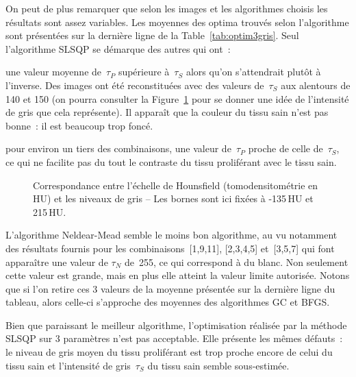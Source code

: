 \documentclass[main.tex]{subfiles}
\begin{document}
On peut de plus remarquer que selon les images et les algorithmes choisis les résultats sont assez variables. Les moyennes des optima trouvés selon l'algorithme sont présentées sur la dernière ligne de la Table~\ref{tab:optim3gris}. Seul l'algorithme SLSQP se démarque des autres qui ont~:
\begin{myitemize}
\item une valeur moyenne de~$\tau_P$ supérieure à~$\tau_S$ alors qu'on s'attendrait plutôt à l'inverse. 
Des images ont été reconstituées avec des valeurs de~$\tau_S$ aux alentours de 140 et 150 (on pourra consulter la Figure~\ref{fig:schema_correspondance_gris} pour se donner une idée de l'intensité de gris que cela représente). Il apparaît que la couleur du tissu sain n'est pas bonne~: il est beaucoup trop foncé. 
\item pour environ un tiers des combinaisons, une valeur de~$\tau_P$ proche de celle de~$\tau_S$, ce qui ne facilite pas du tout le contraste du tissu proliférant avec le tissu sain.
\end{myitemize}

\begin{figure}[h]
\centering

\caption{\label{fig:schema_correspondance_gris} Correspondance entre l'échelle de Hounsfield (tomodensitométrie en HU) et les niveaux de gris -- Les bornes sont ici fixées à -135\,HU et 215\,HU.}
\end{figure}

L'algorithme Neldear-Mead semble le moins bon algorithme, au vu notamment des résultats fournis pour les combinaisons~[1,9,11], [2,3,4,5] et~[3,5,7] qui font apparaître une valeur de $\tau_N$ de~255, ce qui correspond à du blanc. Non seulement cette valeur est grande, mais en plus elle atteint la valeur limite autorisée. Notons que si l'on retire ces 3 valeurs de la moyenne présentée sur la dernière ligne du tableau, alors celle-ci s'approche des moyennes des algorithmes GC et BFGS. 

Bien que paraissant le meilleur algorithme, l'optimisation réalisée par la méthode SLSQP sur 3 paramètres n'est pas acceptable. Elle présente les mêmes défauts~: le niveau de gris moyen du tissu proliférant est trop proche encore de celui du tissu sain et l'intensité de gris~$\tau_S$  du tissu sain semble sous-estimée.
\end{document}
